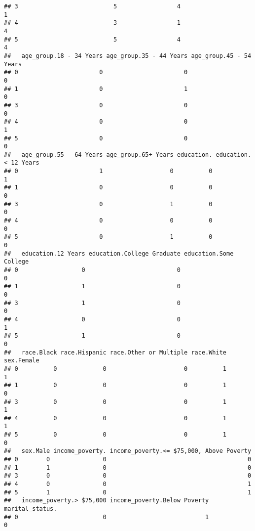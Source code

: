 \documentclass[
]{article}
\begin{document}
\begin{verbatim}
## 3                           5                 4                           1
## 4                           3                 1                           4
## 5                           5                 4                           4
##   age_group.18 - 34 Years age_group.35 - 44 Years age_group.45 - 54 Years
## 0                       0                       0                       0
## 1                       0                       1                       0
## 3                       0                       0                       0
## 4                       0                       0                       1
## 5                       0                       0                       0
##   age_group.55 - 64 Years age_group.65+ Years education. education.< 12 Years
## 0                       1                   0          0                    1
## 1                       0                   0          0                    0
## 3                       0                   1          0                    0
## 4                       0                   0          0                    0
## 5                       0                   1          0                    0
##   education.12 Years education.College Graduate education.Some College
## 0                  0                          0                      0
## 1                  1                          0                      0
## 3                  1                          0                      0
## 4                  0                          0                      1
## 5                  1                          0                      0
##   race.Black race.Hispanic race.Other or Multiple race.White sex.Female
## 0          0             0                      0          1          1
## 1          0             0                      0          1          0
## 3          0             0                      0          1          1
## 4          0             0                      0          1          1
## 5          0             0                      0          1          0
##   sex.Male income_poverty. income_poverty.<= $75,000, Above Poverty
## 0        0               0                                        0
## 1        1               0                                        0
## 3        0               0                                        0
## 4        0               0                                        1
## 5        1               0                                        1
##   income_poverty.> $75,000 income_poverty.Below Poverty marital_status.
## 0                        0                            1               0

\end{verbatim}
\end{document}
